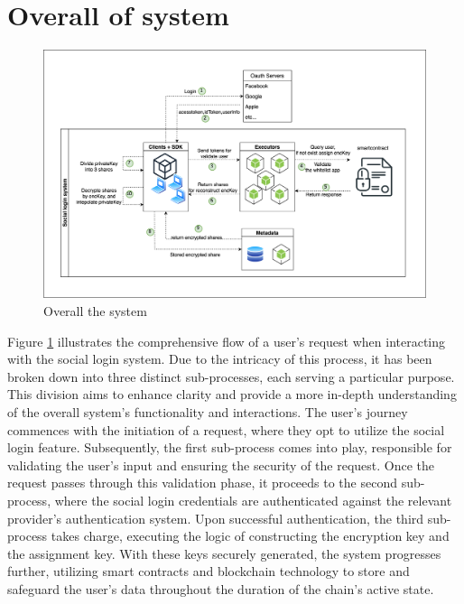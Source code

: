 \documentclass[../Main.tex]{subfiles}
\begin{document}
\section{Overall of system}
\begin{figure}[H]
 \centering
 \includegraphics[scale=0.1]{Figure/OverallSocialLoginSystem.png}
    \caption{Overall the system}
    \label{fig:OverallSystem}
\end{figure}
Figure \ref{fig:OverallSystem} illustrates the comprehensive flow of a user's request when interacting with the social login system. Due to the intricacy of this process, it has been broken down into three distinct sub-processes, each serving a particular purpose. This division aims to enhance clarity and provide a more in-depth understanding of the overall system's functionality and interactions.
The user's journey commences with the initiation of a request, where they opt to utilize the social login feature. Subsequently, the first sub-process comes into play, responsible for validating the user's input and ensuring the security of the request. Once the request passes through this validation phase, it proceeds to the second sub-process, where the social login credentials are authenticated against the relevant provider's authentication system.
Upon successful authentication, the third sub-process takes charge, executing the logic of constructing the encryption key and the assignment key. With these keys securely generated, the system progresses further, utilizing smart contracts and blockchain technology to store and safeguard the user's data throughout the duration of the chain's active state.
\end{document}
